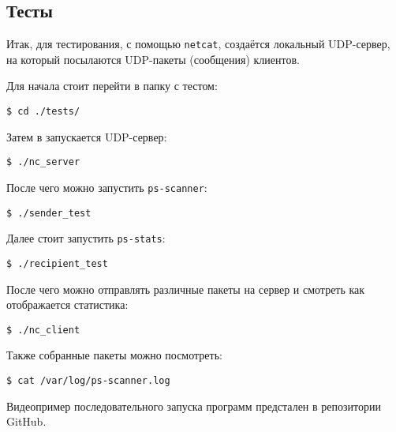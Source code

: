 \subsection{Тесты}

Итак, для тестирования, с помощью \verb|netcat|, создаётся локальный UDP-сервер, на который посылаются UDP-пакеты (сообщения) клиентов.

Для начала стоит перейти в папку с тестом:
\begin{lstlisting}
$ cd ./tests/
\end{lstlisting}

Затем в запускается UDP-сервер:
\begin{lstlisting}
$ ./nc_server
\end{lstlisting}

\newpage

После чего можно запустить \verb|ps-scanner|:
\begin{lstlisting}
$ ./sender_test
\end{lstlisting}

Далее стоит запустить \verb|ps-stats|:
\begin{lstlisting}
$ ./recipient_test
\end{lstlisting}

После чего можно отправлять различные пакеты на сервер и смотреть как отображается статистика:
\begin{lstlisting}
$ ./nc_client
\end{lstlisting}
Также собранные пакеты можно посмотреть:
\begin{lstlisting}
$ cat /var/log/ps-scanner.log
\end{lstlisting}

\linespace

Видеопример последовательного запуска программ предстален в репозитории GitHub.
